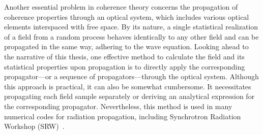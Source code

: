     Another essential problem in coherence theory concerns the propagation of coherence properties through an optical system, which includes various optical elements interspaced with free space. By its nature, a single statistical realization of a field from a random process behaves identically to any other field and can be propagated in the same way, adhering to the wave equation. Looking ahead to the narrative of this thesis, one effective method to calculate the field and its statistical properties upon propagation is to directly apply the corresponding propagator—or a sequence of propagators—through the optical system. Although this approach is practical, it can also be somewhat cumbersome. It necessitates propagating each field sample separately or deriving an analytical expression for the corresponding propagator. Nevertheless, this method is used in many numerical codes for radiation propagation, including Synchrotron Radiation Workshop (SRW)~\cite{chubar_accurate_1998}.
 
